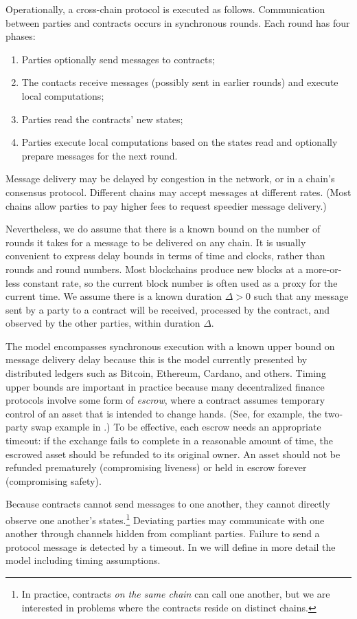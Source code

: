 Operationally,
a cross-chain protocol is executed as follows.
Communication between parties and contracts occurs in synchronous rounds.  
Each round has four phases: 
\begin{enumerate}
\item 
  Parties optionally send messages to contracts;
\item
  The contacts receive messages (possibly sent in earlier rounds)
  and execute local computations;
\item 
  Parties read the contracts' new states;
\item 
  Parties execute local computations based on the states read and optionally prepare messages for the next round. 
\end{enumerate}
Message delivery may be delayed by congestion in the network, or in a chain's consensus protocol.
Different chains may accept messages at different rates.
(Most chains allow parties to pay higher fees to request speedier message delivery.)

Nevertheless,
we do assume that there is a known bound
on the number of rounds it takes for a message to be delivered on any chain.
It is usually convenient to express delay bounds in terms of time and clocks,
rather than rounds and round numbers.
Most blockchains produce new blocks at a more-or-less constant rate,
so the current block number is often used as a proxy for the current time.
We assume there is a known duration $\Delta > 0$
such that any message sent by a party to a contract
will be received, processed by the contract,
and observed by the other parties,
within duration $\Delta$.

The model encompasses synchronous execution with a known upper bound on message delivery delay
because this is the model currently presented by distributed ledgers such as
Bitcoin, Ethereum, Cardano, and others.
Timing upper bounds are important in practice because many decentralized finance protocols
 involve some form of \emph{escrow},
where a contract assumes temporary control of an asset that is intended to change hands.
(See, for example, the two-party swap example in .)
To be effective, each escrow needs an appropriate timeout:
if the exchange fails to complete in a reasonable amount of time,
the escrowed asset should be refunded to its original owner.
An asset should not be refunded prematurely (compromising liveness)
or held in escrow forever (compromising safety).

Because contracts cannot send messages to one another, they cannot directly observe one another's states.\footnote{In practice,
contracts \emph{on the same chain} can call one another, but we are interested in problems
where the contracts reside on distinct chains.}
Deviating parties may communicate with one another through channels
hidden from compliant parties.
Failure to send a protocol message is detected by a timeout. 
In   we will define in more detail the model including timing assumptions.
